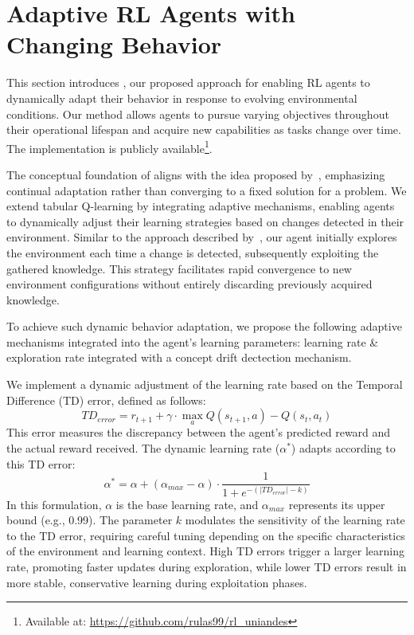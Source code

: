 
\section{Adaptive \ac{RL} Agents with Changing Behavior}
\label{sec:implementation}

This section introduces \adaptiverl, our proposed approach for enabling \ac{RL} agents to dynamically adapt their behavior in response to evolving environmental conditions. Our method allows agents to pursue varying objectives throughout their operational lifespan and acquire new capabilities as tasks change over time. The implementation is publicly available\footnote{Available at: \url{https://github.com/rulas99/rl_uniandes}}.

The conceptual foundation of \adaptiverl aligns with the idea proposed by~\citet{abel2023definitioncontinualreinforcementlearning}, emphasizing continual adaptation rather than converging to a fixed solution for a problem. We extend tabular Q-learning by integrating adaptive mechanisms, enabling agents to dynamically adjust their learning strategies based on changes detected in their environment. Similar to the approach described by~\citet{norman2024firstexploreexploitmetalearningsolve}, our agent initially explores the environment each time a change is detected, subsequently exploiting the gathered knowledge. This strategy facilitates rapid convergence to new environment configurations without entirely discarding previously acquired knowledge.

To achieve such dynamic behavior adaptation, we propose the following adaptive mechanisms integrated into the agent’s learning parameters: learning rate & exploration rate integrated with a concept drift dectection mechanism.

We implement a dynamic adjustment of the learning rate based on the Temporal Difference (TD) error, defined as follows:
\begin{equation}
    \label{eq:td_error}
    TD_{error} = r_{t+1} + \gamma \cdot \underset{a}{\max} Q(s_{t+1}, a) - Q(s_t, a_t)
\end{equation}
This error measures the discrepancy between the agent’s predicted reward and the actual reward received. The dynamic learning rate ($\alpha^*$) adapts according to this TD error:
\begin{equation}
    \label{eq:dynamic_learning_rate}
    \alpha^* = \alpha + (\alpha_{max}-\alpha) \cdot \frac{1}{1 + e^{-(|TD_{error}|-k)}}
\end{equation}
In this formulation, $\alpha$ is the base learning rate, and $\alpha_{max}$ represents its upper bound (e.g., 0.99). The parameter $k$ modulates the sensitivity of the learning rate to the TD error, requiring careful tuning depending on the specific characteristics of the environment and learning context. High TD errors trigger a larger learning rate, promoting faster updates during exploration, while lower TD errors result in more stable, conservative learning during exploitation phases.

